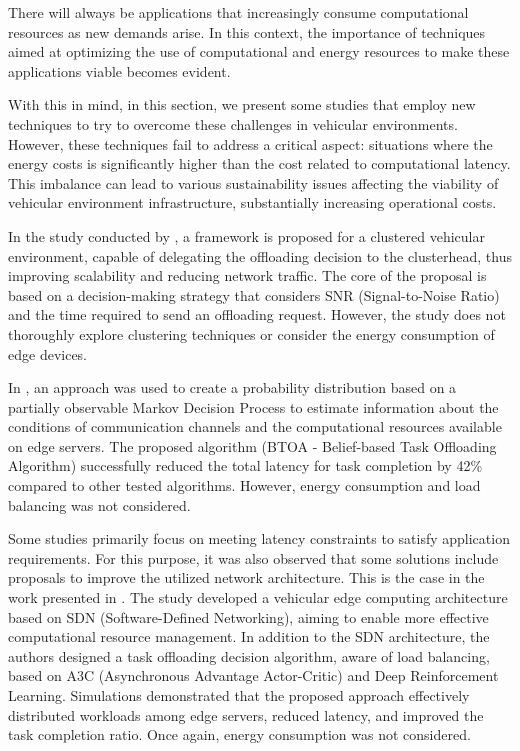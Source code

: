 \documentclass[iicol]{sn-jnl}
\begin{document}
There will always be applications that increasingly consume computational resources as new demands arise. In this context, the importance of techniques aimed at optimizing the use of computational and energy resources to make these applications viable becomes evident.

With this in mind, in this section, we present some studies that employ new techniques to try to overcome these challenges in vehicular environments. However, these techniques fail to address a critical aspect: situations where the energy costs is significantly higher than the cost related to computational latency. This imbalance can lead to various sustainability issues affecting the viability of vehicular environment infrastructure, substantially increasing operational costs.

In the study conducted by \cite{sarieddine2022opportunistic}, a framework is proposed for a clustered vehicular environment, capable of delegating the offloading decision to the clusterhead, thus improving scalability and reducing network traffic. The core of the proposal is based on a decision-making strategy that considers SNR (Signal-to-Noise Ratio) and the time required to send an offloading request. However, the study does not thoroughly explore clustering techniques or consider the energy consumption of edge devices.

In \cite{ko2023belief}, an approach was used to create a probability distribution based on a partially observable Markov Decision Process to estimate information about the conditions of communication channels and the computational resources available on edge servers. The proposed algorithm (BTOA - Belief-based Task Offloading Algorithm) successfully reduced the total latency for task completion by 42\% compared to other tested algorithms. However, energy consumption and load balancing was not considered.

Some studies primarily focus on meeting latency constraints to satisfy application requirements. For this purpose, it was also observed that some solutions include proposals to improve the utilized network architecture. This is the case in the work presented in \cite{lu2023a3c}. The study developed a vehicular edge computing architecture based on SDN (Software-Defined Networking), aiming to enable more effective computational resource management. In addition to the SDN architecture, the authors designed a task offloading decision algorithm, aware of load balancing, based on A3C (Asynchronous Advantage Actor-Critic) \cite{mnih2016asynchronous} and Deep Reinforcement Learning. Simulations demonstrated that the proposed approach effectively distributed workloads among edge servers, reduced latency, and improved the task completion ratio. Once again, energy consumption was not considered.
\end{document}
